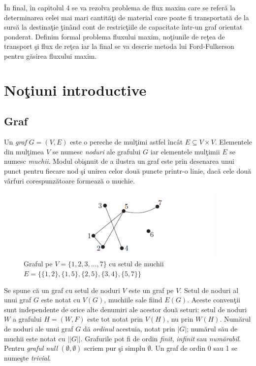 \documentclass[11pt,a4paper]{report}
\begin{document}
	\^ In final, \^ in capitolul 4 se va rezolva problema de flux maxim care se refer\u a la determinarea  celei mai mari cantit\u a\c ti de material care poate fi transportat\u a de la surs\u a la destina\c tie \c tin\^ and cont de restric\c tiile de capacitate \^ intr-un graf orientat ponderat. Definim formal problema fluxului maxim, no\c tiunile de re\c tea de transport \c si flux de re\c tea iar la final se va descrie metoda lui Ford-Fulkerson pentru g\u asirea fluxului maxim.
	
	
	

	\chapter{No\c tiuni introductive}
	
	\section{Graf}
	
    Un \textit{graf} $G=(V,E)$ este o pereche  de mul\c timi astfel \^ inc\^ at $E\subseteq V\times V$. Elementele din mul\c timea $V$ se numesc \textit{noduri} ale grafului $G$ iar elementele mul\c timii $E$ se numesc \textit{muchii}. Modul obi\c snuit de a ilustra un graf este prin desenarea unui punct pentru fiecare nod \c si unirea celor dou\u a puncte printr-o linie, dac\u a cele dou\u a v\^ arfuri corespunz\u atoare formeaz\u a o muchie.
	
	
	\begin{figure}[!hbt]
		\centering
		\includegraphics[width=10.2cm]{Figura1.png}
		\caption{Graful pe $V=\{ 1,2,3,...,7\}$ cu setul de muchii \centering \newline $E=\{ \{1,2\},\{1,5\},\{2,5\},\{3,4\},\{5,7\} \}$ }
		\end{figure}
	
	Se spune c\u a un graf cu setul de noduri $V$ este un graf pe $V$. Setul de noduri al unui graf $G$ este notat cu $V(G)$, muchiile sale fiind $E(G)$. Aceste conven\c tii sunt independente de orice alte denumiri ale acestor dou\u a seturi: setul de noduri $W$ a grafului $H=(W,F)$ este tot notat prin $V(H)$, nu prin $W(H)$. Num\u arul de noduri ale unui graf $G$ d\u a \textit{ordinul} acestuia, notat prin $|G|$; num\u arul s\u au de muchii este notat cu $||G||$. Grafurile pot fi de ordin \textit{finit}, \textit{infinit} sau \textit{num\u arabil}. Pentru \textit{graful null} $(\emptyset,\emptyset)$ scriem pur \c si simplu $\emptyset$. Un graf de ordin 0 sau 1 se nume\c ste \textit{trivial}.
	
\end{document}
